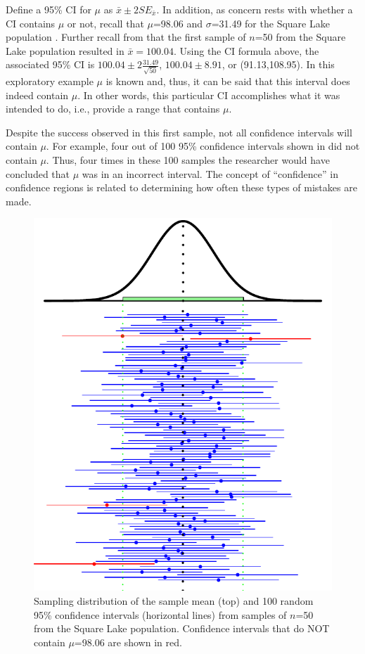\documentclass[10pt,openany]{book}\usepackage[]{graphicx}\usepackage[]{color}
\newenvironment{knitrout}{}{} %
\begin{document}
Define a 95\% CI for $\mu$ as $\bar{x}\pm2SE_{\bar{x}}$.  In addition, as concern rests with whether a CI contains $\mu$ or not, recall that $\mu$=98.06 and $\sigma$=31.49 for the Square Lake population .  Further recall from  that the first sample of $n$=50 from the Square Lake population resulted in $\bar{x}=100.04$.  Using the CI formula above, the associated 95\% CI is $100.04\pm2\frac{31.49}{\sqrt{50}}$, $100.04\pm8.91$, or (91.13,108.95).  In this exploratory example $\mu$ is known and, thus, it can be said that this interval does indeed contain $\mu$.  In other words, this particular CI accomplishes what it was intended to do, i.e., provide a range that contains $\mu$.

Despite the success observed in this first sample, not all confidence intervals will contain $\mu$.  For example, four out of 100 95\% confidence intervals shown in  did not contain $\mu$.  Thus, four times in these 100 samples the researcher would have concluded that $\mu$ was in an incorrect interval.  The concept of ``confidence'' in confidence regions is related to determining how often these types of mistakes are made.

\begin{knitrout}
\color{fgcolor}\begin{figure}[hbtp]

{\centering \includegraphics[width=.6\linewidth]{Figs/CIex100-1} 

}

\caption[Sampling distribution of the sample mean (top) and 100 random 95\% confidence intervals (horizontal lines) from samples of $n$=50 from the Square Lake population]{Sampling distribution of the sample mean (top) and 100 random 95\% confidence intervals (horizontal lines) from samples of $n$=50 from the Square Lake population.  Confidence intervals that do NOT contain $\mu$=98.06 are shown in red.}\label{fig:CIex100}
\end{figure}


\end{knitrout}
\end{document}
